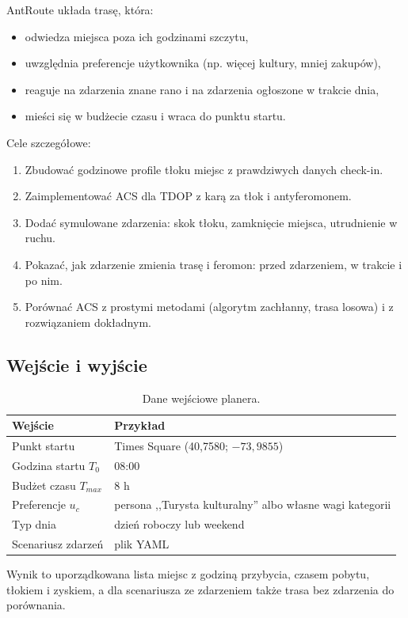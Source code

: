 \documentclass[11pt,a4paper]{article}
\begin{document}
AntRoute układa trasę, która:
\begin{itemize}
  \item odwiedza miejsca poza ich godzinami szczytu,
  \item uwzględnia preferencje użytkownika (np. więcej kultury, mniej zakupów),
  \item reaguje na zdarzenia znane rano i na zdarzenia ogłoszone w trakcie dnia,
  \item mieści się w budżecie czasu i wraca do punktu startu.
\end{itemize}

Cele szczegółowe:
\begin{enumerate}
  \item Zbudować godzinowe profile tłoku miejsc z prawdziwych danych check-in.
  \item Zaimplementować ACS dla TDOP z karą za tłok i antyferomonem.
  \item Dodać symulowane zdarzenia: skok tłoku, zamknięcie miejsca, utrudnienie w ruchu.
  \item Pokazać, jak zdarzenie zmienia trasę i feromon: przed zdarzeniem, w trakcie i po nim.
  \item Porównać ACS z prostymi metodami (algorytm zachłanny, trasa losowa) i z rozwiązaniem dokładnym.
\end{enumerate}

\subsection{Wejście i wyjście}

\begin{table}[h]
\centering
\caption{Dane wejściowe planera.}
\begin{tabular}{ll}
\toprule
Wejście & Przykład \\
\midrule
Punkt startu & Times Square (40,7580; $-73{,}9855$) \\
Godzina startu $T_0$ & 08:00 \\
Budżet czasu $T_{max}$ & 8 h \\
Preferencje $u_c$ & persona ,,Turysta kulturalny'' albo własne wagi kategorii \\
Typ dnia & dzień roboczy lub weekend \\
Scenariusz zdarzeń & plik YAML \\
\bottomrule
\end{tabular}
\end{table}

Wynik to uporządkowana lista miejsc z godziną przybycia, czasem pobytu, tłokiem i zyskiem, a dla scenariusza ze zdarzeniem także trasa bez zdarzenia do porównania.
\end{document}
